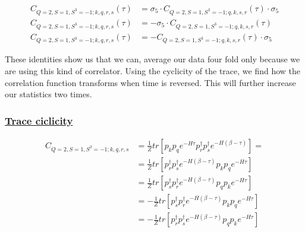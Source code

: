 \begin{equation*}
  \begin{aligned}
    C_{Q=2,S=1,S^3=-1;k,q,r,s} (\tau) &= \sigma_5\cdot C_{Q=2,S=1,S^3=-1;q,k,s,r} (\tau)\cdot\sigma_5\\
    C_{Q=2,S=1,S^3=-1;k,q,r,s} (\tau) &= -\sigma_5\cdot C_{Q=2,S=1,S^3=-1;q,k,s,r} (\tau)\\
    C_{Q=2,S=1,S^3=-1;k,q,r,s} (\tau) &= - C_{Q=2,S=1,S^3=-1;q,k,s,r} (\tau)\cdot\sigma_5
  \end{aligned}
\end{equation*}

These identities show us that we can, average our data four fold only because we are using this kind of correlator. Using the cyclicity of the trace, we find how the correlation function transforms when time is reversed. This will further increase our statistics two times.

\subsubsection{\underline{Trace ciclicity}}

\begin{equation*}
  \begin{aligned}
    C_{Q=2,S=1,S^3=-1;k,q,r,s} &= \frac{1}{Z}tr\left[p_kp_qe^{-H\tau}p^\dagger_rp^\dagger_se^{-H\left(\beta-\tau\right)}\right] =\\
    &= \frac{1}{Z}tr\left[p^\dagger_rp^\dagger_se^{-H\left(\beta-\tau\right)}p_kp_qe^{-H\tau}\right] \\
    &= \frac{1}{Z}tr\left[p^\dagger_sp^\dagger_re^{-H\left(\beta-\tau\right)}p_qp_ke^{-H\tau}\right] \\
    &= - \frac{1}{Z}tr\left[p^\dagger_sp^\dagger_re^{-H\left(\beta-\tau\right)}p_kp_qe^{-H\tau}\right] \\
    &= - \frac{1}{Z}tr\left[p^\dagger_rp^\dagger_se^{-H\left(\beta-\tau\right)}p_qp_ke^{-H\tau}\right]
  \end{aligned}
\end{equation*}

